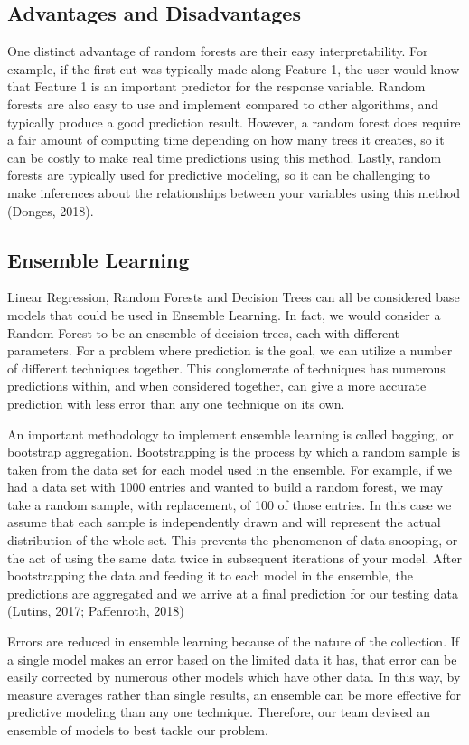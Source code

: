 \subsection{Advantages and Disadvantages}
\tab One distinct advantage of random forests are their easy interpretability. For example, if the first cut was typically made along Feature 1, the user would know that Feature 1 is an important predictor for the response variable. Random forests are also easy to use and implement compared to other algorithms, and typically produce a good prediction result. However, a random forest does require a fair amount of computing time depending on how many trees it creates, so it can be costly to make real time predictions using this method. Lastly, random forests are typically used for predictive modeling, so it can be challenging to make inferences about the relationships between your variables using this method (Donges, 2018).

\subsection{Ensemble Learning}
\tab Linear Regression, Random Forests and Decision Trees can all be considered base models that could be used in Ensemble Learning. In fact, we would consider a Random Forest to be an ensemble of decision trees, each with different parameters. For a problem where prediction is the goal, we can utilize a number of different techniques together. This conglomerate of techniques has numerous predictions within, and when considered together, can give a more accurate prediction with less error than any one technique on its own. \newline

\tab An important methodology to implement ensemble learning is called bagging, or bootstrap aggregation. Bootstrapping is the process by which a random sample is taken from the data set for each model used in the ensemble. For example, if we had a data set with 1000 entries and wanted to build a random forest, we may take a random sample, with replacement, of 100 of those entries. In this case we assume that each sample is independently drawn and will represent the actual distribution of the whole set. This prevents the phenomenon of data snooping, or the act of using the same data twice in subsequent iterations of your model. After bootstrapping the data and feeding it to each model in the ensemble, the predictions are aggregated and we arrive at a final prediction for our testing data (Lutins, 2017; Paffenroth, 2018)
\newline \tab 

Errors are reduced in ensemble learning because of the nature of the collection. If a single model makes an error based on the limited data it has, that error can be easily corrected by numerous other models which have other data. In this way, by measure averages rather than single results, an ensemble can be more effective for predictive modeling than any one technique. Therefore, our team devised an ensemble of models to best tackle our problem. 